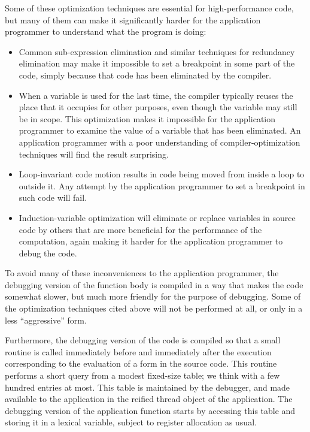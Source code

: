 Some of these optimization techniques are essential for
high-performance code, but many of them can make it significantly
harder for the application programmer to understand what the
program is doing:

\begin{itemize}
\item Common sub-expression elimination and similar techniques for
  redundancy elimination may make it impossible to set
  a breakpoint in some part of the code, simply because that code has
  been eliminated by the compiler.
\item When a variable is used for the last time, the compiler
  typically reuses the place that it occupies for other purposes, even
  though the variable may still be in scope.  This optimization makes
  it impossible for the application programmer to examine the value of
  a variable that has been eliminated.  An application programmer with
  a poor understanding of compiler-optimization techniques will find
  the result surprising.
\item Loop-invariant code motion results in code being moved from
  inside a loop to outside it.  Any attempt by the application
  programmer to set a breakpoint in such code will fail.
\item Induction-variable optimization will eliminate or replace
  variables in source code by others that are more beneficial for
  the performance of the computation, again making it harder for the
  application programmer to debug the code.
\end{itemize}

To avoid many of these inconveniences to the application programmer,
the debugging version of the function body is compiled in a way that
makes the code somewhat slower, but much more friendly for the purpose
of debugging.  Some of the optimization techniques cited above will
not be performed at all, or only in a less ``aggressive'' form.

Furthermore, the debugging version of the code is compiled so that a
small routine is called immediately before and immediately after the
execution corresponding to the evaluation of a form in the source
code.  This routine performs a short query from a modest fixed-size
table; we think with a few hundred entries at most.  This table is
maintained by the debugger, and made available to the application in
the reified thread object of the application.  The debugging version
of the application function starts by accessing this table and storing
it in a lexical variable, subject to register allocation as usual.


